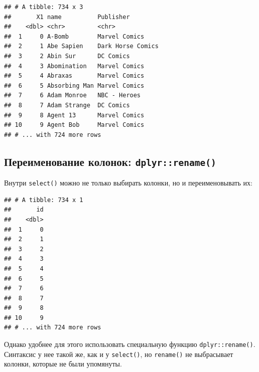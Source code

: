 \documentclass[]{book}
\newenvironment{Shaded}{\begin{snugshade}}{\end{snugshade}}
\newcommand{\KeywordTok}[1]{\textcolor[rgb]{0.13,0.29,0.53}{\textbf{#1}}}
\newcommand{\DataTypeTok}[1]{\textcolor[rgb]{0.13,0.29,0.53}{#1}}
\newcommand{\StringTok}[1]{\textcolor[rgb]{0.31,0.60,0.02}{#1}}
\newcommand{\OperatorTok}[1]{\textcolor[rgb]{0.81,0.36,0.00}{\textbf{#1}}}
\newcommand{\NormalTok}[1]{#1}
\begin{document}
\begin{verbatim}
## # A tibble: 734 x 3
##       X1 name          Publisher        
##    <dbl> <chr>         <chr>            
##  1     0 A-Bomb        Marvel Comics    
##  2     1 Abe Sapien    Dark Horse Comics
##  3     2 Abin Sur      DC Comics        
##  4     3 Abomination   Marvel Comics    
##  5     4 Abraxas       Marvel Comics    
##  6     5 Absorbing Man Marvel Comics    
##  7     6 Adam Monroe   NBC - Heroes     
##  8     7 Adam Strange  DC Comics        
##  9     8 Agent 13      Marvel Comics    
## 10     9 Agent Bob     Marvel Comics    
## # ... with 724 more rows
\end{verbatim}

\subsection{\texorpdfstring{Переименование колонок:
\texttt{dplyr::rename()}}{Переименование колонок: dplyr::rename()}}\label{ux43fux435ux440ux435ux438ux43cux435ux43dux43eux432ux430ux43dux438ux435-ux43aux43eux43bux43eux43dux43eux43a-dplyrrename}

Внутри \texttt{select()} можно не только выбирать колонки, но и
переименовывать их:

\begin{Shaded}
\end{Shaded}

\begin{verbatim}
## # A tibble: 734 x 1
##       id
##    <dbl>
##  1     0
##  2     1
##  3     2
##  4     3
##  5     4
##  6     5
##  7     6
##  8     7
##  9     8
## 10     9
## # ... with 724 more rows
\end{verbatim}

Однако удобнее для этого использовать специальную функцию
\texttt{dplyr::rename()}. Синтаксис у нее такой же, как и у
\texttt{select()}, но \texttt{rename()} не выбрасывает колонки, которые
не были упомянуты.

\begin{Shaded}
\end{Shaded}
\end{document}
